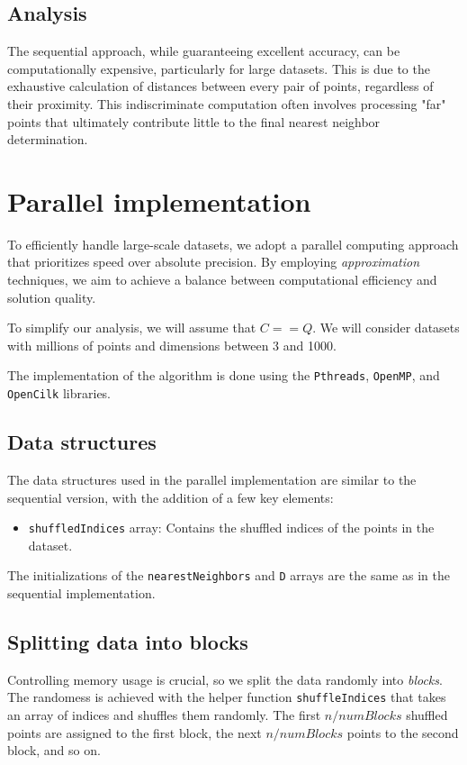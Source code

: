 \documentclass{article}
\begin{document}
\subsection{Analysis}
The sequential approach, while guaranteeing excellent accuracy, can be computationally expensive, particularly for large datasets. 
This is due to the exhaustive calculation of distances between every pair of points, regardless of their proximity. 
This indiscriminate computation often involves processing "far" points that ultimately contribute little to the final nearest neighbor determination.


\section{Parallel implementation}

To efficiently handle large-scale datasets, we adopt a parallel computing approach that prioritizes speed over absolute precision. 
By employing \emph{approximation} techniques, we aim to achieve a balance between computational efficiency and solution quality.

To simplify our analysis, we will assume that $C==Q$. We will consider datasets with millions of points and dimensions between 3 and 1000.

The implementation of the algorithm is done using the \texttt{Pthreads}, \texttt{OpenMP}, and \texttt{OpenCilk} libraries.

\subsection{Data structures}
The data structures used in the parallel implementation are similar to the sequential version, with the addition of a few key elements:
\begin{itemize}
    \item \texttt{shuffledIndices} array: Contains the shuffled indices of the points in the dataset.
    
\end{itemize}

The initializations of the \texttt{nearestNeighbors} and \texttt{D} arrays are the same as in the sequential implementation.

\subsection{Splitting data into blocks}
Controlling memory usage is crucial, so we split the data randomly into \emph{blocks}. The randomess is achieved with the helper 
function \texttt{shuffleIndices} that takes an array of indices and shuffles them randomly. The first $n / numBlocks$ shuffled
points are assigned to the first block, the next $n / numBlocks$ points to the second block, and so on.
\end{document}
